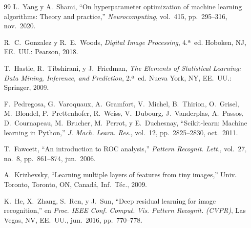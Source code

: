 \documentclass[conference]{IEEEtran}
\begin{document}
\begin{thebibliography}{99}
L.~Yang y A.~Shami,
``On hyperparameter optimization of machine learning algorithms: Theory and
  practice,''
\emph{Neurocomputing}, vol.~415, pp.~295--316, nov.~2020.

R.~C.~Gonzalez y R.~E.~Woods,
\emph{Digital Image Processing}, 4.ª~ed.
Hoboken, NJ, EE.~UU.: Pearson, 2018.

T.~Hastie, R.~Tibshirani, y J.~Friedman,
\emph{The Elements of Statistical Learning: Data Mining, Inference, and
  Prediction}, 2.ª~ed.
Nueva York, NY, EE.~UU.: Springer, 2009.

F.~Pedregosa, G.~Varoquaux, A.~Gramfort, V.~Michel, B.~Thirion,
O.~Grisel, M.~Blondel, P.~Prettenhofer, R.~Weiss, V.~Dubourg,
J.~Vanderplas, A.~Passos, D.~Cournapeau, M.~Brucher, M.~Perrot,
y E.~Duchesnay,
``Scikit-learn: Machine learning in {Python},''
\emph{J. Mach. Learn. Res.}, vol.~12, pp.~2825--2830, oct.~2011.

T.~Fawcett,
``An introduction to ROC analysis,''
\emph{Pattern Recognit. Lett.}, vol.~27, no.~8, pp.~861--874, jun.~2006.

A.~Krizhevsky,
``Learning multiple layers of features from tiny images,''
Univ. Toronto, Toronto, ON, Canadá, Inf.~Téc., 2009.

K.~He, X.~Zhang, S.~Ren, y J.~Sun,
``Deep residual learning for image recognition,''
en \emph{Proc. IEEE Conf. Comput. Vis. Pattern Recognit. (CVPR)},
Las Vegas, NV, EE.~UU., jun.~2016, pp.~770--778.

\end{thebibliography}
\end{document}
